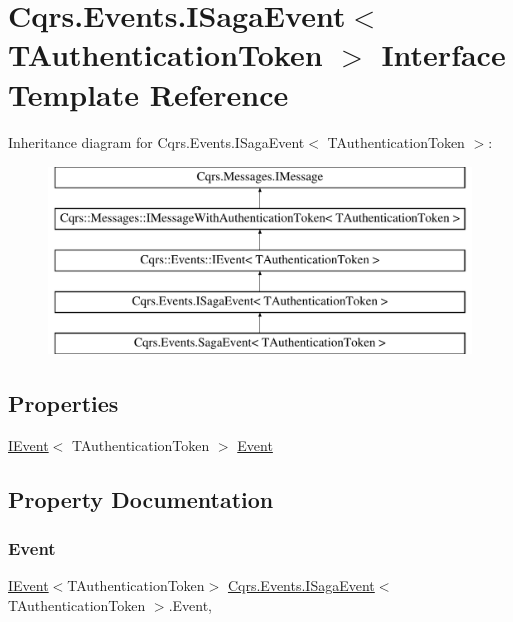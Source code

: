 \hypertarget{interfaceCqrs_1_1Events_1_1ISagaEvent}{}\section{Cqrs.\+Events.\+I\+Saga\+Event$<$ T\+Authentication\+Token $>$ Interface Template Reference}
\label{interfaceCqrs_1_1Events_1_1ISagaEvent}
Inheritance diagram for Cqrs.\+Events.\+I\+Saga\+Event$<$ T\+Authentication\+Token $>$\+:\begin{figure}[H]
\begin{center}
\leavevmode
\includegraphics[height=5.000000cm]{interfaceCqrs_1_1Events_1_1ISagaEvent}
\end{center}
\end{figure}
\subsection*{Properties}
\begin{DoxyCompactItemize}
\item 
\hyperlink{interfaceCqrs_1_1Events_1_1IEvent}{I\+Event}$<$ T\+Authentication\+Token $>$ \hyperlink{interfaceCqrs_1_1Events_1_1ISagaEvent_adc0c41f6a64cadb56d758093c02ef266}{Event}
\end{DoxyCompactItemize}


\subsection{Property Documentation}
\mbox{\label{interfaceCqrs_1_1Events_1_1ISagaEvent_adc0c41f6a64cadb56d758093c02ef266}} 
\subsubsection{\texorpdfstring{Event}{Event}}
{\footnotesize\ttfamily \hyperlink{interfaceCqrs_1_1Events_1_1IEvent}{I\+Event}$<$T\+Authentication\+Token$>$ \hyperlink{interfaceCqrs_1_1Events_1_1ISagaEvent}{Cqrs.\+Events.\+I\+Saga\+Event}$<$ T\+Authentication\+Token $>$.Event\hspace{0.3cm}{\ttfamily [get]}, {\ttfamily [set]}}

